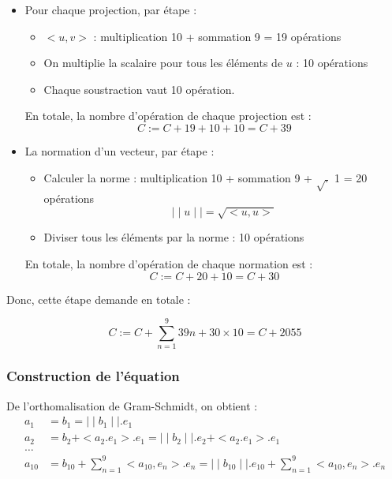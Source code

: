 \documentclass{article}
\begin{document}
\begin{itemize}
    \item 
Pour chaque projection, par étape :
\begin{itemize}
    \item $<u,v>$ : multiplication 10 + sommation 9 = 19 opérations
    \item On multiplie la scalaire pour tous les éléments de $u$ : 10 opérations
    \item Chaque soustraction vaut 10 opération.
\end{itemize}

En totale, la nombre d'opération de chaque projection est :
\[
C := C + 19 + 10 + 10 = C + 39
\]

\item
La normation d'un vecteur, par étape :
\begin{itemize}
    \item Calculer la norme : multiplication 10 + sommation 9 + $\sqrt{.}$ 1 = 20 opérations  \[
    \mid  \mid u  \mid  \mid = \sqrt{<u, u>}
    \]
    \item Diviser tous les éléments par la norme : 10 opérations
    
\end{itemize}
En totale, la nombre d'opération de chaque normation est :
\[
C := C + 20 + 10 = C + 30
\]
\end{itemize}

Donc, cette étape demande en totale :
\begin{tcolorbox}
    \[
    C := C + \sum_{n=1}^{9} 39n + 30 \times 10 = C + 2055
\]
\end{tcolorbox}

\subsubsection{Construction de l'équation} 

De l'orthomalisation de Gram-Schmidt, on obtient :
\begin{align*}
    a_1 &= b_1 =  \mid  \mid b_1  \mid  \mid . e_1 \\
    a_2 &= b_2 + <a_2.e_1>.e_1 =  \mid   \mid b_2  \mid  \mid .e_2 + <a_2.e_1>.e_1\\
    \ldots \\
    a_{10} &= b_{10} + \sum_{n=1}^{9} <a_{10}, e_n>.e_n =  \mid  \mid b_{10}  \mid  \mid .e_{10} + \sum_{n=1}^{9} <a_{10}, e_n>.e_n
\end{align*}
\end{document}
